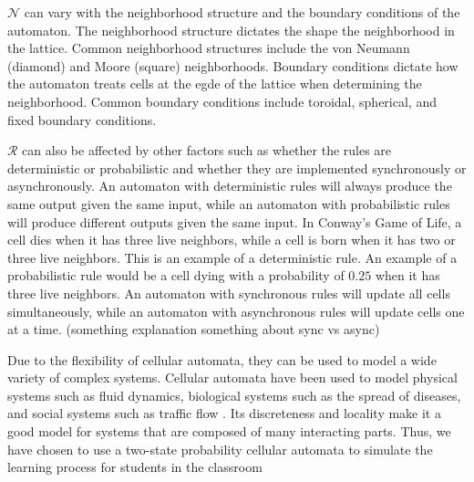 

$\mathcal{N}$ can vary with the neighborhood structure and the boundary conditions of the automaton. The neighborhood structure dictates the shape the neighborhood in the lattice. Common neighborhood structures include the von Neumann (diamond) and Moore (square) neighborhoods. Boundary conditions dictate how the automaton treats cells at the egde of the lattice when determining the neighborhood. Common boundary conditions include toroidal, spherical, and fixed boundary conditions. 

$\mathcal{R}$ can also be affected by other factors such as whether the rules are deterministic or probabilistic and whether they are implemented synchronously or asynchronously. An automaton with deterministic rules will always produce the same output given the same input, while an automaton with probabilistic rules will produce different outputs given the same input. In Conway's Game of Life, a cell dies when it has three live neighbors, while a cell is born when it has two or three live neighbors. This is an example of a deterministic rule. An example of a probabilistic rule would be a cell dying with a probability of $0.25$ when it has three live neighbors. An automaton with synchronous rules will update all cells simultaneously, while an automaton with asynchronous rules will update cells one at a time. (something explanation something about sync vs async)


Due to the flexibility of cellular automata, they can be used to model a wide variety of complex systems. Cellular automata have been used to model physical systems such as fluid dynamics, biological systems such as the spread of diseases, and social systems such as traffic flow \cite{louis2018probabilistic}. Its discreteness and locality make it a good model for systems that are composed of many interacting parts. Thus, we have chosen to use a two-state probability cellular automata to simulate the learning process for students in the classroom


